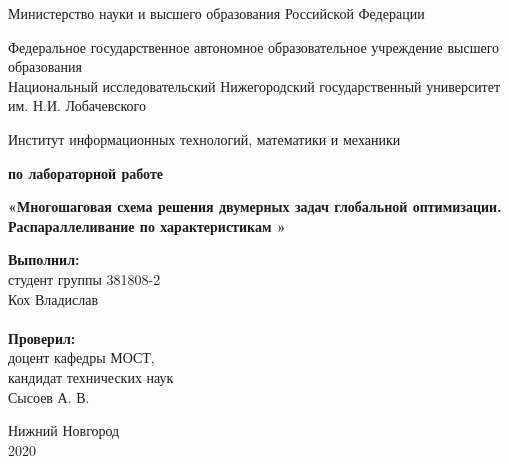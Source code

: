 \documentclass{report}
\begin{document}
\begin{titlepage}

\begin{center}
Министерство науки и высшего образования Российской Федерации
\end{center}

\begin{center}
Федеральное государственное автономное образовательное учреждение высшего образования \\
Национальный исследовательский Нижегородский государственный университет им. Н.И. Лобачевского
\end{center}

\begin{center}
Институт информационных технологий, математики и механики
\end{center}

\vspace{4em}

\begin{center}
\textbf{ по лабораторной работе} \\
\end{center}
\begin{center}
\textbf{\Large«Многошаговая схема решения двумерных задач глобальной оптимизации.
Распараллеливание по характеристикам
»} \\
\end{center}

\vspace{4em}

\newbox{\lbox}
\newlength{\maxl}
\setlength{\maxl}{\wd\lbox}
\hfill\parbox{7cm}{
\hspace*{5cm}\hspace*{-5cm}\textbf{Выполнил:} \\ студент группы 381808-2 \\ Кох Владислав\\
\\
\hspace*{5cm}\hspace*{-5cm}\textbf{Проверил:}\\ доцент кафедры МОСТ, \\ кандидат технических наук \\ Сысоев А. В.\\
}
\vspace{\fill}

\begin{center} Нижний Новгород \\ 2020 \end{center}

\end{titlepage}
\end{document}
